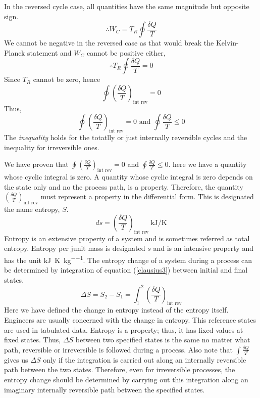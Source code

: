 In the reversed cycle case, all quantities have the same magnitude but opposite sign.
\begin{equation}
  \therefore W_C = T_R \oint \frac{\delta Q}{T}
\end{equation}
We cannot be negative in the reversed case as that would break the Kelvin-Planck statement and \(W_C\) cannot be positive either,
\begin{equation}
  \therefore T_R \oint \frac{\delta Q}{T} = 0
\end{equation}
Since \(T_R\) cannot be zero, hence
\begin{equation}
  \oint \left( \frac{\delta Q}{T} \right)_{\textrm{int rev}} = 0
\end{equation}
Thus,
\begin{equation}
  \oint \left( \frac{\delta Q}{T} \right)_{\textrm{int rev}} = 0 \textrm{ and } \oint \frac{\delta Q}{T} \leq 0
\end{equation}
The \emph{inequality} holds for the totatlly or just internally reversible cycles and the inequality for irreversible ones.

We have proven that \( \oint \left( \frac{\delta Q}{T} \right)_{\textrm{int rev}} = 0 \) and \( \oint \frac{\delta Q}{T} \leq 0 \). here we have a quantity whose cyclic integral is zero. A quantity whose cyclic integral is zero depends on the state only and no the process path, is a property. Therefore, the quantity \( \left( \frac{\delta Q}{T} \right)_{\textrm{int rev}} \) must represent a property in the differential form. This is designated the name entropy, \(S\).
\begin{equation}
  ds = \left( \frac{\delta Q}{T} \right)_{\textrm{int rev}} \ \si{\kilo\joule\per\kelvin} \label{clausius3}
\end{equation}
Entropy is an extensive property of a system and is sometimes referred as total entropy. Entropy per junit mass is designated \( s\) and is an intensive property and has the unit \si{\kilo\joule\per\kelvin\per\kg}. The entropy change of a system during a process can be determined by integration of equation (\ref{clausius3}) between initial and final states.
\begin{equation}
  \Delta S = S_2 - S_1 = \int_1^2 \left( \frac{\delta Q}{T} \right)_{\textrm{int rev}}
\end{equation}
Here we have defined the change in entropy instead of the entropy itself. Engineers are usually concerned with the change in entropy. This reference states are used in tabulated data. Entropy is a property; thus, it has fixed values at fixed states. Thus, \(\Delta S\) between two specified states is the same no matter what path, reversible or irreversible is followed during a process. Also note that \( \int \frac{\delta Q}{T}\) gives us \(\Delta S\) only if the integration is carried out along an internally reversible path between the two states. Therefore, even for irreversible processes, the entropy change should be determined by carrying out this integration along an imaginary internally reversible path between the specified states.

